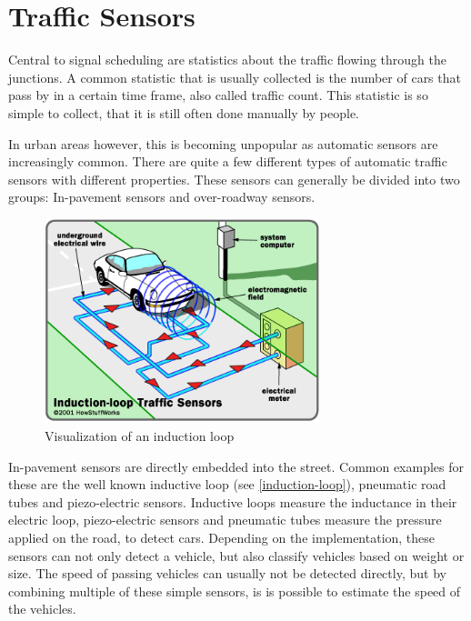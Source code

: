 \section{Traffic Sensors}
\label{trafficSensors}

Central to signal scheduling are statistics about the traffic flowing through the junctions. A common statistic that is usually collected is the number of cars that pass by in a certain time frame, also called traffic count. This statistic is so simple to collect, that it is still often done manually by people.

In urban areas however, this is becoming unpopular as automatic sensors are increasingly common. There are quite a few different types of automatic traffic sensors with different properties. These sensors can generally be divided into two groups: In-pavement sensors and over-roadway sensors. \cite{tmg}

\begin{figure}[ht]
	\centering
	\includegraphics[width=8cm]{figures/induction-loop}
	\caption[Visualization of an induction loop]{Visualization of an induction loop\protect\footnotemark}
	\label{induction-loop}
\end{figure}


In-pavement sensors are directly embedded into the street. Common examples for these are the well known inductive loop (see \autoref{induction-loop}), pneumatic road tubes and piezo-electric sensors. Inductive loops measure the inductance in their electric loop, piezo-electric sensors and pneumatic tubes measure the pressure applied on the road, to detect cars. Depending on the implementation, these sensors can not only detect a vehicle, but also classify vehicles based on weight or size. The speed of passing vehicles can usually not be detected directly, but by combining multiple of these simple sensors, is is possible to estimate the speed of the vehicles.


